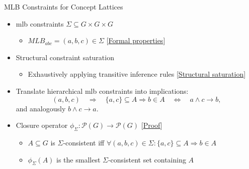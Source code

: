 \begin{frame}{MLB Constraints for Concept Lattices}
\hypertarget{main:mlb-constraints}{}
\begin{itemize}
    \item \acs{mlb} constraints $\Sigma \subseteq G \times G \times G$
    \begin{itemize}
        \item $MLB_{a b c}=(a,b,c) \in \Sigma$ {\tiny[\hyperlink{appendix:mlb-defs}{Formal properties}]}
    \end{itemize}

    \item<2-> Structural constraint saturation
    \begin{itemize}
       
        
        \item Exhaustively applying transitive inference rules {\tiny[\hyperlink{appendix:saturation}{Structural saturation}]}
        \begin{center}
        \end{center}
    \end{itemize}

    \item<3-> Translate hierarchical \ac{mlb} constraints into implications:
        \[
        (a,b,c)
        \quad\Rightarrow\quad
        \{a,c\}\subseteq A \Rightarrow b\in A
        \quad\Leftrightarrow\quad
        a\wedge c\rightarrow b,
        \]
        and analogously $b\wedge c\rightarrow a$.

    \item<4-> Closure operator $\phi_{\Sigma}: \mathcal{P}(G) \to \mathcal{P}(G)$ {\tiny[\hyperlink{appendix:closure-proof}{Proof}]}
    \begin{itemize}
        \item $A \subseteq G$ is $\Sigma$-consistent iff
            $
            \forall (a,b,c)\in\Sigma:
            \{a,c\}\subseteq A \Rightarrow b\in A
            $
        \item $\phi_{\Sigma}(A)$ is the smallest $\Sigma$-consistent set containing $A$
    \end{itemize}


\end{itemize}
\end{frame}
